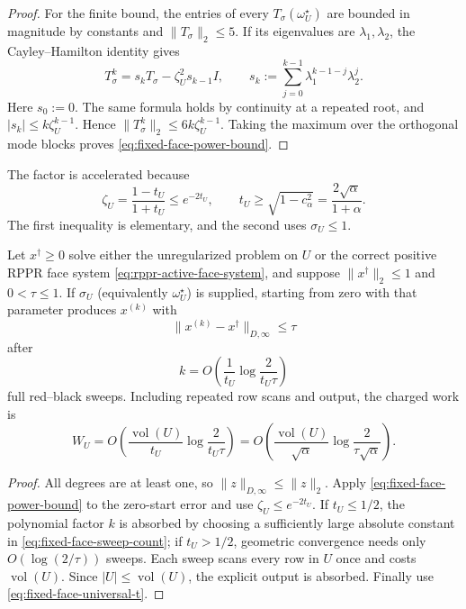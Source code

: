 \begin{proof}
For the finite bound, the entries of every $T_\sigma(\omega_U^\star)$ are
bounded in magnitude by constants and
$\|T_\sigma\|_2\leq5$.  If its eigenvalues are $\lambda_1,\lambda_2$, the
Cayley--Hamilton identity gives
\begin{equation*}
 T_\sigma^k=s_kT_\sigma-\zeta_U^2s_{k-1}I,
 \qquad
 s_k:=\sum_{j=0}^{k-1}\lambda_1^{k-1-j}\lambda_2^j.
\end{equation*}
Here $s_0:=0$.  The same formula holds by continuity at a repeated root, and
$|s_k|\leq k\zeta_U^{k-1}$.  Hence
$\|T_\sigma^k\|_2\leq6k\zeta_U^{k-1}$.  Taking the maximum over the
orthogonal mode blocks proves \eqref{eq:fixed-face-power-bound}.
\end{proof}

The factor is accelerated because
\begin{equation}
 \zeta_U=\frac{1-t_U}{1+t_U}\leq e^{-2t_U},
 \qquad
 t_U\geq\sqrt{1-c_\alpha^2}
 =\frac{2\sqrt\alpha}{1+\alpha}.
 \label{eq:fixed-face-universal-t}
\end{equation}
The first inequality is elementary, and the second uses $\sigma_U\leq1$.

\begin{corollary}
\label{cor:fixed-face-semantic-sor}
Let $x^\dagger\geq0$ solve either the unregularized problem on $U$ or the
correct positive RPPR face system \eqref{eq:rppr-active-face-system}, and
suppose $\|x^\dagger\|_2\leq1$ and $0<\tau\leq1$.  If
$\sigma_U$ (equivalently $\omega_U^\star$) is supplied, starting from zero
with that parameter produces $x^{(k)}$ with
\begin{equation}
 \|x^{(k)}-x^\dagger\|_{D,\infty}\leq\tau
 \label{eq:fixed-face-semantic-target}
\end{equation}
after
\begin{equation}
 k=O\!\left(
  \frac1{t_U}\log\frac{2}{t_U\tau}
 \right)
 \label{eq:fixed-face-sweep-count}
\end{equation}
full red--black sweeps.  Including repeated row scans and output, the charged
work is
\begin{equation}
 W_U=O\!\left(
  \frac{\operatorname{vol}(U)}{t_U}
  \log\frac{2}{t_U\tau}
 \right)
 =O\!\left(
  \frac{\operatorname{vol}(U)}{\sqrt\alpha}
  \log\frac{2}{\tau\sqrt\alpha}
 \right).
 \label{eq:fixed-face-work}
\end{equation}
\end{corollary}

\begin{proof}
All degrees are at least one, so
$\|z\|_{D,\infty}\leq\|z\|_2$.  Apply
\eqref{eq:fixed-face-power-bound} to the zero-start error and use
$\zeta_U\leq e^{-2t_U}$.  If $t_U\leq1/2$, the polynomial factor $k$ is
absorbed by choosing a sufficiently large absolute constant in
\eqref{eq:fixed-face-sweep-count}; if $t_U>1/2$, geometric convergence needs
only $O(\log(2/\tau))$ sweeps.  Each sweep scans every row in $U$ once and
costs $\operatorname{vol}(U)$.  Since $|U|\leq\operatorname{vol}(U)$, the
explicit output is absorbed.  Finally use \eqref{eq:fixed-face-universal-t}.
\end{proof}

